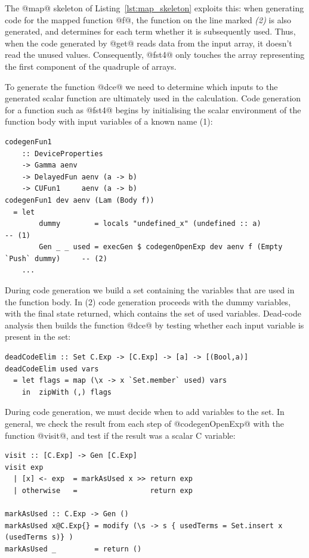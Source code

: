 The @map@ skeleton of Listing~\ref{lst:map_skeleton} exploits this: when
generating code for the mapped function @f@, the function  on the line marked \emph{(2)} is also generated, and determines
for each term whether it is subsequently used. Thus, when the code generated by
@get@ reads data from the input array, it doesn't read the unused values.
Consequently, @fst4@ only touches the array representing the first
component of the quadruple of arrays.

To generate the function @dce@ we need to determine which inputs to the
generated scalar function are ultimately used in the calculation. Code
generation for a function such as @fst4@ begins by initialising the
scalar environment of the function body with input variables of a known name
(1):
%
\begin{lstlisting}[style=haskell]
codegenFun1
    :: DeviceProperties
    -> Gamma aenv
    -> DelayedFun aenv (a -> b)
    -> CUFun1     aenv (a -> b)
codegenFun1 dev aenv (Lam (Body f))
  = let
        dummy        = locals "undefined_x" (undefined :: a)                        -- (1)
        Gen _ _ used = execGen $ codegenOpenExp dev aenv f (Empty `Push` dummy)     -- (2)
    ...
\end{lstlisting}
%
During code generation we build a set containing the variables that are used in
the function body. In (2) code generation proceeds with the dummy variables,
with the final state returned, which contains the set of used variables.
Dead-code analysis then builds the function @dce@ by testing whether each
input variable is present in the set:
%
\begin{lstlisting}[style=haskell]
deadCodeElim :: Set C.Exp -> [C.Exp] -> [a] -> [(Bool,a)]
deadCodeElim used vars
  = let flags = map (\x -> x `Set.member` used) vars
    in  zipWith (,) flags
\end{lstlisting}

During code generation, we must decide when to add variables to the set. In
general, we check the result from each step of @codegenOpenExp@ with the
function @visit@, and test if the result was a scalar C variable:
%
\begin{lstlisting}[style=haskell]
visit :: [C.Exp] -> Gen [C.Exp]
visit exp
  | [x] <- exp  = markAsUsed x >> return exp
  | otherwise   =                 return exp

markAsUsed :: C.Exp -> Gen ()
markAsUsed x@C.Exp{} = modify (\s -> s { usedTerms = Set.insert x (usedTerms s)} )
markAsUsed _         = return ()
\end{lstlisting}


